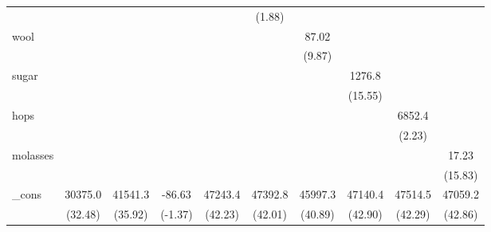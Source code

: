 {\begin{tabular}{l*{9}{c}}
            &                     &                     &                     &                     &      (1.88)         &                     &                     &                     &                     \\
[1em]
wool        &                     &                     &                     &                     &                     &       87.02\sym{***}&                     &                     &                     \\
            &                     &                     &                     &                     &                     &      (9.87)         &                     &                     &                     \\
[1em]
sugar       &                     &                     &                     &                     &                     &                     &      1276.8\sym{***}&                     &                     \\
            &                     &                     &                     &                     &                     &                     &     (15.55)         &                     &                     \\
[1em]
hops        &                     &                     &                     &                     &                     &                     &                     &      6852.4\sym{**} &                     \\
            &                     &                     &                     &                     &                     &                     &                     &      (2.23)         &                     \\
[1em]
molasses    &                     &                     &                     &                     &                     &                     &                     &                     &       17.23\sym{***}\\
            &                     &                     &                     &                     &                     &                     &                     &                     &     (15.83)         \\
[1em]
\_cons      &     30375.0\sym{***}&     41541.3\sym{***}&      -86.63         &     47243.4\sym{***}&     47392.8\sym{***}&     45997.3\sym{***}&     47140.4\sym{***}&     47514.5\sym{***}&     47059.2\sym{***}\\
            &     (32.48)         &     (35.92)         &     (-1.37)         &     (42.23)         &     (42.01)         &     (40.89)         &     (42.90)         &     (42.29)         &     (42.86)         \\

\end{tabular}}
